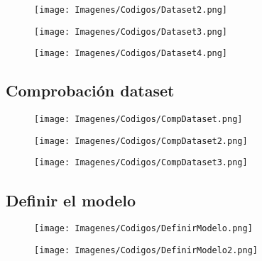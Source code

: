 \documentclass{report}
\begin{document}
\begin{figure}[H]
    \raggedright
    \texttt{[image: Imagenes/Codigos/Dataset2.png]}
\end{figure}


\begin{figure}[H]
    \raggedright
    \texttt{[image: Imagenes/Codigos/Dataset3.png]}
\end{figure}


\begin{figure}[H]
    \raggedright
    \texttt{[image: Imagenes/Codigos/Dataset4.png]}
\end{figure}







\subsection{Comprobación dataset}

\begin{figure}[H]
    \raggedright
    \texttt{[image: Imagenes/Codigos/CompDataset.png]}
\end{figure}


\begin{figure}[H]
    \raggedright
    \texttt{[image: Imagenes/Codigos/CompDataset2.png]}
\end{figure}


\begin{figure}[H]
    \raggedright
    \texttt{[image: Imagenes/Codigos/CompDataset3.png]}
\end{figure}









\subsection{Definir el modelo}

\begin{figure}[H]
    \raggedright
    \texttt{[image: Imagenes/Codigos/DefinirModelo.png]}
\end{figure}


\begin{figure}[H]
    \raggedright
    \texttt{[image: Imagenes/Codigos/DefinirModelo2.png]}
\end{figure}
\end{document}
